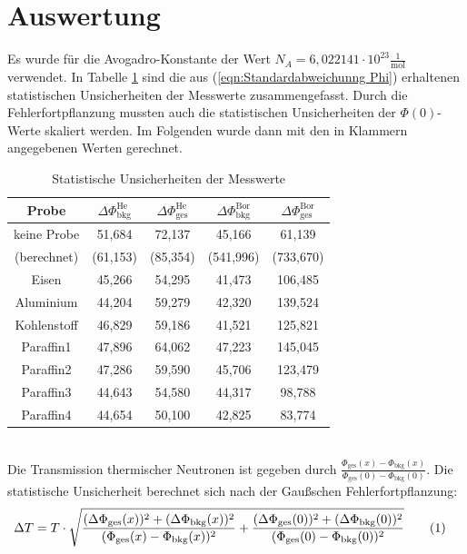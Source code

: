 \documentclass[german, parskip=full]{scrartcl}
\newcommand\numberthis{\addtocounter{equation}{1}\tag{\theequation}}
\newcommand{\tecxt}{}
\begin{document}
\section{Auswertung}
Es wurde für die Avogadro-Konstante der Wert $N_A=6,022141\cdot 10^{23}\frac{1}{\tecxt\text{mol}}$ verwendet. In Tabelle \ref{table:Unsicherheiten Messwerte} sind die aus (\ref{eqn:Standardabweichunng Phi}) erhaltenen statistischen Unsicherheiten der Messwerte zusammengefasst. Durch die Fehlerfortpflanzung mussten auch die statistischen Unsicherheiten der $\Phi(0)$-Werte skaliert werden. Im Folgenden wurde dann mit den in Klammern angegebenen Werten gerechnet.
\begin{table}[h!]
\centering
\begin{tabular}{c||c|c||c|c}
Probe&$\Delta\Phi_\tecxt\text{bkg}^\tecxt\text{He}$&$\Delta\Phi_\tecxt\text{ges}^\tecxt\text{He}$&$\Delta\Phi_\tecxt\text{bkg}^\tecxt\text{Bor}$&$\Delta\Phi_\tecxt\text{ges}^\tecxt\text{Bor}$\\ \hline
keine Probe&51,684&72,137&45,166&61,139\\ 
(berechnet)&(61,153)& (85,354)&(541,996)&(733,670)\\ \hline
Eisen&45,266&54,295&41,473&106,485\\ \hline
Aluminium&44,204&59,279&42,320&139,524\\ \hline
Kohlenstoff&46,829&	59,186&41,521&125,821\\ \hline
Paraffin1&47,896&64,062&47,223&145,045\\ \hline
Paraffin2&47,286&59,590&45,706&123,479\\ \hline
Paraffin3&44,643&54,580&44,317&98,788\\ \hline
Paraffin4&44,654&50,100&42,825&83,774\\ 
\end{tabular}
\caption{Statistische Unsicherheiten der Messwerte}
\label{table:Unsicherheiten Messwerte}
\end{table}\\
Die Transmission thermischer Neutronen ist gegeben durch $\frac{\Phi_\tecxt\text{ges}(x)-\Phi_\tecxt\text{bkg}(x)}{\Phi_\tecxt\text{ges}(0)-\Phi_\tecxt\text{bkg}(0)}$. Die statistische Unsicherheit berechnet sich nach der Gaußschen Fehlerfortpflanzung:
\begin{align*}
\Delta T&=T\cdot\sqrt{\frac{(\Delta\Phi_\tecxt\text{ges}(x))^2+(\Delta\Phi_\tecxt\text{bkg}(x))^2}{(\Phi_\tecxt\text{ges}(x)-\Phi_\tecxt\text{bkg}(x))^2}+\frac{(\Delta\Phi_\tecxt\text{ges}(0))^2+(\Delta\Phi_\tecxt\text{bkg}(0))^2}{(\Phi_\tecxt\text{ges}(0)-\Phi_\tecxt\text{bkg}(0))^2}}\numberthis\label{eqn:Delta T von phi}
\end{align*}
\end{document}
